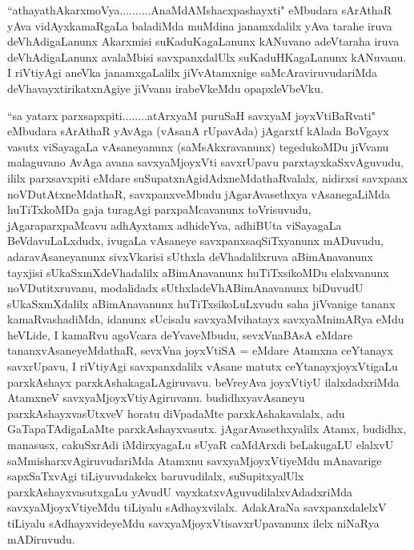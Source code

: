 
\begin{artha}
``athayathAkarxmoVya..........AnaMdAMshacxpashayxti" eMbudara sArAthaR yAva vidAyxkamaRgaLa baladiMda muMdina janamxdalilx yAva tarahe iruva deVhAdigaLanunx Akarxmisi suKaduKagaLanunx kANuvano adeVtaraha iruva deVhAdigaLanunx avalaMbisi savxpanxdalUlx suKaduHKagaLanunx kANuvanu. I riVtiyAgi aneVka janamxgaLalilx jiVvAtamxnige saMcAraviruvudariMda deVhavayxtirikatxnAgiye jiVvanu irabeVkeMdu opapxleVbeVku.
\end{artha}


\begin{artha}
``sa yatarx parxsapxpiti........atArxyaM puruSaH savxyaM joyxVtiBaRvati" eMbudara sArAthaR yAvAga (vAsanA rUpavAda) jAgarxtf kAlada BoVgayx vasutx viSayagaLa vAsaneyanunx (saMsAkxravanunx) tegedukoMDu jiVvanu malaguvano AvAga avana savxyaMjoyxVti savxrUpavu parxtayxkaSxvAguvudu, ililx parxsavxpiti eMdare suSupatxnAgidAdxneMdathaRvalalx, nidirxsi savxpanx noVDutAtxneMdathaR, savxpanxveMbudu jAgarAvasethxya vAsanegaLiMda huTiTxkoMDa gaja turagAgi parxpaMcavanunx toVrisuvudu, jAgaraparxpaMcavu adhAyxtamx adhideYva, adhiBUta viSayagaLa BeVdavuLaLxdudx, ivugaLa vAsaneye savxpanxsaqSiTxyanunx mADuvudu, adaravAsaneyanunx sivxVkarisi sUthxla deVhadalilxruva aBimAnavanunx tayxjisi sUkaSxmXdeVhadalilx aBimAnavanunx huTiTxsikoMDu elalxvanunx noVDutitxruvanu, modalidadx sUthxladeVhABimAnavanunx biDuvudU sUkaSxmXdalilx aBimAnavanunx huTiTxsikoLuLxvudu saha jiVvanige tananx kamaRvashadiMda, idanunx sUcisalu savxyaMvihatayx savxyaMnimARya eMdu heVLide, I kamaRvu agoVcara deYvaveMbudu, sevxVnaBAsA eMdare tananxvAsaneyeMdathaR, sevxVna joyxVtiSA = eMdare Atamxna ceYtanayx savxrUpavu, I riVtiyAgi savxpanxdalilx vAsane matutx ceYtanayxjoyxVtigaLu parxkAshayx parxkAshakagaLAgiruvavu. beVreyAva joyxVtiyU ilalxdadxriMda AtamxneV savxyaMjoyxVtiyAgiruvanu. budidhxyavAsaneyu parxkAshayxvasUtxveV horatu diVpadaMte parxkAshakavalalx, adu GaTapaTAdigaLaMte parxkAshayxvasutx. jAgarAvasethxyalilx Atamx, budidhx, manasusx, cakuSxrAdi iMdirxyagaLu sUyaR caMdArxdi beLakugaLU elalxvU saMmisharxvAgiruvudariMda Atamxnu savxyaMjoyxVtiyeMdu mAnavarige sapxSaTxvAgi tiLiyuvudakekx baruvudilalx, suSupitxyalUlx parxkAshayxvasutxgaLu yAvudU vayxkatxvAguvudilalxvAdadxriMda savxyaMjoyxVtiyeMdu tiLiyalu sAdhayxvilalx. AdakAraNa savxpanxdalelxV tiLiyalu sAdhayxvideyeMdu savxyaMjoyxVtisavxrUpavanunx ilelx niNaRya mADiruvudu.
\end{artha}%

